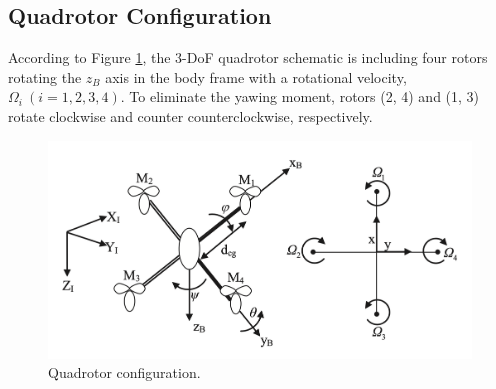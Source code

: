 \documentclass[3p]{elsarticle}
\begin{document}
 \subsection{Quadrotor Configuration}
 \noindent According to Figure \ref{fig:schematic}, the 3-DoF quadrotor schematic is including four rotors rotating the $z_B$ axis in the body frame with a rotational velocity, $\Omega_i~(i=1, 2, 3, 4)$. To eliminate the yawing moment, rotors (2, 4) and (1, 3) rotate clockwise and counter counterclockwise, respectively.

\begin{figure}[H]
    \centering
    \includegraphics[width=12cm]{../Figure/schematic.png}
    \caption{Quadrotor configuration.}
    \label{fig:schematic}
\end{figure}
\end{document}
